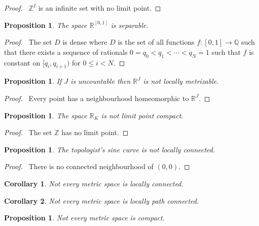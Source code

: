 \documentclass{report}
\let\qed\relax
\newtheorem{prop}[lm]{Proposition}
\newtheorem{cor}{Corollary}[lm]
\theoremstyle{definition}
\begin{document}
\begin{proof}
	\pf\ $\mathbb{Z}^I$ is an infinite set with no limit point. \qed
\end{proof}

\begin{prop}
	The space $\mathbb{R}^{[0,1]}$ is separable.
\end{prop}

\begin{proof}
  \pf\ The set $D$ is dense where $D$ is the set of all functions $f : [0,1]
\rightarrow \mathbb{Q}$ such that there exists a sequence of rationals $0 = q_0
< q_1 < \cdots < q_N = 1$ such that $f$ is constant on $[q_i, q_{i+1})$ for $0
\leq i < N$. \qed
\end{proof}

\begin{prop}
  If $J$ is uncountable then $\mathbb{R}^J$ is not locally metrizable.
\end{prop}

\begin{proof}
  \pf\ Every point has a neighbourhood homeomorphic to $\mathbb{R}^J$. \qed
\end{proof}

\begin{prop}
  The space $\mathbb{R}_K$ is not limit point compact.
\end{prop}

\begin{proof}
  \pf\ The set $\mathbb{Z}$ has no limit point. \qed
\end{proof}

\begin{prop}
 The topologist's sine curve is not locally connected.
\end{prop}

\begin{proof}
 \pf\ There is no connected neighbourhood of $(0,0)$. \qed
\end{proof}

\begin{cor}
Not every metric space is locally connected.
\end{cor}

\begin{cor}
Not every metric space is locally path connected.
\end{cor}

\begin{prop}
  Not every metric space is compact.
\end{prop}
\end{document}
